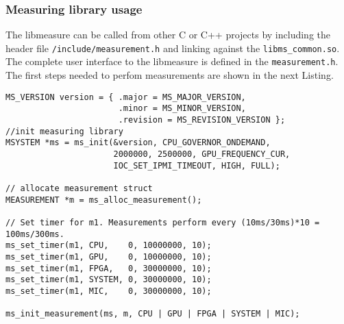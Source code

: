 \subsubsection{Measuring library usage}
\label{sec:libmeasureUsage}

The libmeasure can be called from other C or C++ projects by including the header file \texttt{/include/measurement.h} and linking against the \texttt{libms\_common.so}. The complete user interface to the libmeasure is defined in the \texttt{measurement.h}.
The first steps needed to perfom measurements are shown in the next Listing.

\begin{lstlisting}[caption={Initialization of our measuring library \texttt{libmeasure}. Each function name has a \texttt{ms\_} prefix.},label=lst:InitMS]
MS_VERSION version = { .major = MS_MAJOR_VERSION,
					   .minor = MS_MINOR_VERSION,
					   .revision = MS_REVISION_VERSION };
//init measuring library
MSYSTEM *ms = ms_init(&version, CPU_GOVERNOR_ONDEMAND,
                      2000000, 2500000, GPU_FREQUENCY_CUR, 
                      IOC_SET_IPMI_TIMEOUT, HIGH, FULL);
	
// allocate measurement struct
MEASUREMENT *m = ms_alloc_measurement();
	
// Set timer for m1. Measurements perform every (10ms/30ms)*10 = 100ms/300ms.
ms_set_timer(m1, CPU,    0, 10000000, 10);
ms_set_timer(m1, GPU,    0, 10000000, 10);
ms_set_timer(m1, FPGA,   0, 30000000, 10);
ms_set_timer(m1, SYSTEM, 0, 30000000, 10);
ms_set_timer(m1, MIC,    0, 30000000, 10);

ms_init_measurement(ms, m, CPU | GPU | FPGA | SYSTEM | MIC);
\end{lstlisting}

